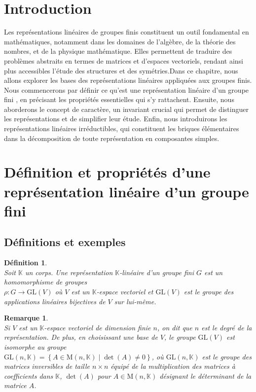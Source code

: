 \documentclass[a4paper, 14pt]{report}
\newtheorem{definition}{Définition}[section]
\newtheorem{remark}{Remarque}[section]
\begin{document}
\begin{onehalfspace}
{			\section*{Introduction}
			Les représentations linéaires de groupes finis constituent un outil fondamental en mathématiques, notamment dans les domaines de l'algèbre, de la théorie des nombres, et de la physique mathématique. Elles permettent de traduire des problèmes abstraits en termes de matrices et d'espaces vectoriels, rendant ainsi plus accessibles l'étude des structures et des symétries.Dans ce chapitre, nous allons explorer les bases des représentations linéaires appliquées aux groupes finis. Nous commencerons par définir ce qu'est une représentation linéaire d'un groupe fini \cite{serre1971representation}, en précisant les propriétés essentielles qui s'y rattachent. Ensuite, nous aborderons le concept de caractère, un invariant crucial qui permet de distinguer les représentations et de simplifier leur étude. Enfin, nous introduirons les représentations linéaires irréductibles, qui constituent les briques élémentaires dans la décomposition de toute représentation en composantes simples.
			
			
			
			
			
			\section{Définition et propriétés d'une représentation linéaire d'un groupe fini}
			\subsection{Définitions et exemples}
			\begin{definition} \cite{serre1971representation} \\
				Soit \(\mathbb{K}\) un corps. Une \emph{représentation \(\mathbb{K}\)-linéaire} d'un groupe fini \(G\) est un homomorphisme de groupes \\
				\(\rho : G \rightarrow \mathrm{GL}(V)\) où  \(V\) est un \(\mathbb{K}\)-espace vectoriel et \(\mathrm{GL}(V)\) est le groupe des applications linéaires bijectives de \(V\) sur lui-même.
			\end{definition}
			
			\begin{remark} \cite{serre1971representation} \\
				Si \(V\) est un \(\mathbb{K}\)-espace vectoriel de dimension finie \(n\), on dit que  \(n\) est le degré de la représentation. De plus, en choisissant une base  de \(V\), le groupe \(\mathrm{GL}(V)\) est isomorphe au groupe \\
				\(\mathrm{GL}(n, \mathbb{K}) = \left\{ A \in \mathrm{M}(n, \mathbb{K}) \mid \det(A) \neq 0 \right\}\), où \(\mathrm{GL}(n, \mathbb{K})\) est le groupe des matrices inversibles de taille  \(n \times n\) équipé de la multiplication des matrices à coefficients dans \(\mathbb{K}\), $\det(A)$ pour $A \in \mathrm{M}(n, \mathbb{K})$ désignant le déterminant de la matrice $A$.	
			\end{remark}
			
}
\end{onehalfspace}
\end{document}
